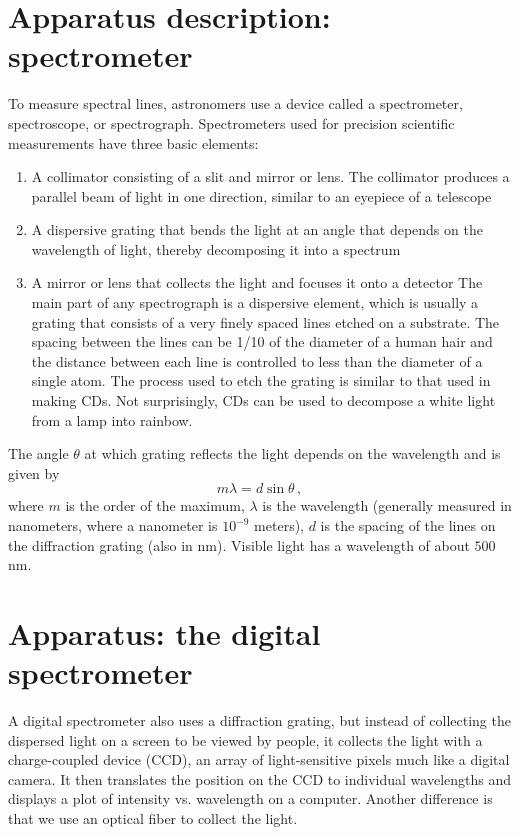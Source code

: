 \section{Apparatus description: spectrometer}

To measure spectral lines, astronomers use a device called a spectrometer, spectroscope, or spectrograph. Spectrometers used for precision scientific measurements have three basic elements:
\begin{enumerate}
	\item A collimator consisting of a slit and mirror or lens. The collimator produces a
parallel beam of light in one direction, similar to an eyepiece of a telescope

	\item A dispersive grating that bends the light at an angle that depends on the
wavelength of light, thereby decomposing it into a spectrum

	\item A mirror or lens that collects the light and focuses it onto a detector
The main part of any spectrograph is a dispersive element, which is usually a grating that
consists of a very finely spaced lines etched on a substrate. The spacing between the
lines can be 1/10 of the diameter of a human hair and the distance between each line is
controlled to less than the diameter of a single atom. The process used to etch the grating
is similar to that used in making CDs. Not surprisingly, CDs can be used to decompose a
white light from a lamp into rainbow.%
\end{enumerate}

The angle $\theta$ at which grating reflects the light depends on the wavelength and is given by
\begin{equation}
 m \lambda = d \sin{\theta}\,,
\end{equation}
where $m$ is the order of the maximum, $\lambda$ is the wavelength (generally measured in nanometers, where a nanometer is $10^{-9}$ meters), $d$ is the spacing of the lines on the diffraction grating (also in nm). Visible light has a wavelength of about $500\:$nm.

\section{Apparatus: the digital spectrometer}

A digital spectrometer also uses a diffraction grating, but instead of collecting the dispersed light on a screen to be viewed by people, it collects the light with a charge-coupled device (CCD), an array of light-sensitive pixels much like a digital camera. It then translates the position on the CCD to individual wavelengths and displays a plot of intensity vs. wavelength on a computer. %
Another difference is that we use an optical fiber to collect the light.

